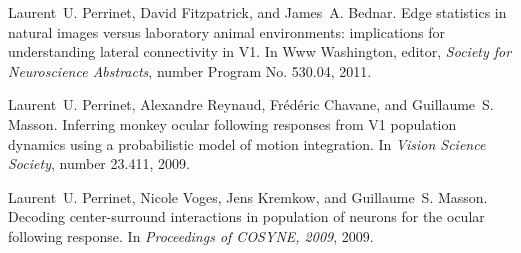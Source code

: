 \documentclass[11pt,french,a4paper,oneside]{article}%
\begin{document}
\begin{etaremune}
\item {}
\item {}
\item {}
\item {}
\item {}

\item {}
\item {}

%
%


%

\item %
Laurent~U. Perrinet, David Fitzpatrick, and James~A. Bednar.
\newblock Edge statistics in natural images versus laboratory animal
  environments: implications for understanding lateral connectivity in {V1}.
\newblock In Www Washington, editor, \emph{Society for Neuroscience Abstracts},
  number Program No. 530.04, 2011.

\item {}


\item %
Laurent~U. Perrinet, Alexandre Reynaud, Fr{\'e}d{\'e}ric Chavane, and
  Guillaume~S. Masson.
\newblock Inferring monkey ocular following responses from {V1} population
  dynamics using a probabilistic model of motion integration.
\newblock In \emph{Vision Science Society}, number 23.411, 2009.

\item %
Laurent~U. Perrinet, Nicole Voges, Jens Kremkow, and Guillaume~S. Masson.
\newblock Decoding center-surround interactions in population of neurons for
  the ocular following response.
\newblock In \emph{Proceedings of COSYNE, 2009}, 2009.


\end{etaremune}
\end{document}
